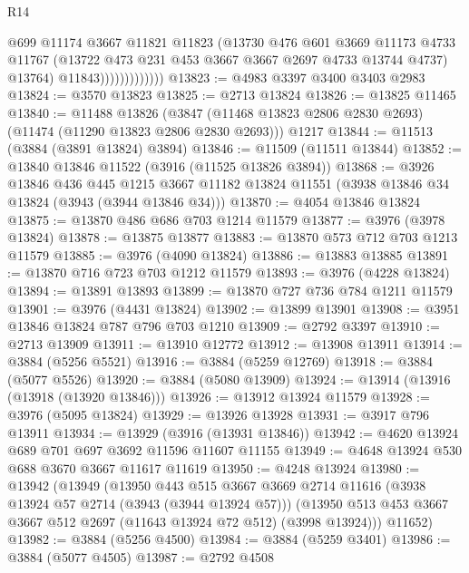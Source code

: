 \begin{lexlean}{R14}
\begin{coremodule}
                              @699
                              @11174
                              @3667
                              @11821
                              @11823
                              (@13730
                                @476
                                @601
                                @3669
                                @11173
                                @4733
                                @11767
                                (@13722 @473 @231 @453 @3667 @3667 @2697 @4733 @13744 @4737)
                                @13764)
                              @11843)))))))))))))
@13823 := @4983 @3397 @3400 @3403 @2983
@13824 := @3570 @13823
@13825 := @2713 @13824
@13826 := @13825 @11465
@13840 := @11488
    @13826
    (@3847 (@11468 @13823 @2806 @2830 @2693) (@11474 (@11290 @13823 @2806 @2830 @2693)))
    @1217
@13844 := @11513 (@3884 (@3891 @13824) @3894)
@13846 := @11509 (@11511 @13844)
@13852 := @13840 @13846 @11522 (@3916 (@11525 @13826 @3894))
@13868 := @3926
    @13846
    @436
    @445
    @1215
    @3667
    @11182
    @13824
    @11551
    (@3938 @13846 @34 @13824 (@3943 (@3944 @13846 @34)))
@13870 := @4054 @13846 @13824
@13875 := @13870 @486 @686 @703 @1214 @11579
@13877 := @3976 (@3978 @13824)
@13878 := @13875 @13877
@13883 := @13870 @573 @712 @703 @1213 @11579
@13885 := @3976 (@4090 @13824)
@13886 := @13883 @13885
@13891 := @13870 @716 @723 @703 @1212 @11579
@13893 := @3976 (@4228 @13824)
@13894 := @13891 @13893
@13899 := @13870 @727 @736 @784 @1211 @11579
@13901 := @3976 (@4431 @13824)
@13902 := @13899 @13901
@13908 := @3951 @13846 @13824 @787 @796 @703 @1210
@13909 := @2792 @3397
@13910 := @2713 @13909
@13911 := @13910 @12772
@13912 := @13908 @13911
@13914 := @3884 (@5256 @5521)
@13916 := @3884 (@5259 @12769)
@13918 := @3884 (@5077 @5526)
@13920 := @3884 (@5080 @13909)
@13924 := @13914 (@13916 (@13918 (@13920 @13846)))
@13926 := @13912 @13924 @11579
@13928 := @3976 (@5095 @13824)
@13929 := @13926 @13928
@13931 := @3917 @796 @13911
@13934 := @13929 (@3916 (@13931 @13846))
@13942 := @4620 @13924 @689 @701 @697 @3692 @11596 @11607 @11155
@13949 := @4648 @13924 @530 @688 @3670 @3667 @11617 @11619
@13950 := @4248 @13924
@13980 := @13942
    (@13949
      (@13950
        @443
        @515
        @3667
        @3669
        @2714
        @11616
        (@3938 @13924 @57 @2714 (@3943 (@3944 @13924 @57)))
        (@13950 @513 @453 @3667 @3667 @512 @2697 (@11643 @13924 @72 @512) (@3998 @13924)))
      @11652)
@13982 := @3884 (@5256 @4500)
@13984 := @3884 (@5259 @3401)
@13986 := @3884 (@5077 @4505)
@13987 := @2792 @4508

\end{coremodule}
\end{lexlean}
